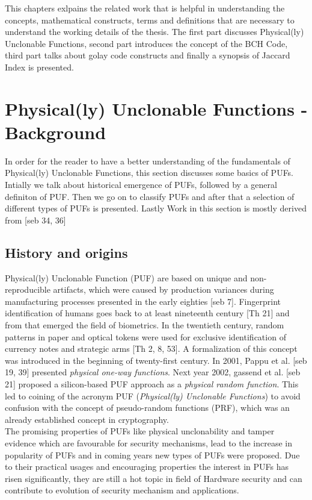 This chapters exlpains the related work that is helpful in understanding the concepts, mathematical constructs, terms and definitions that are necessary to understand the working details of the thesis. The first part discusses Physical(ly) Unclonable Functions, second part introduces the concept of the BCH Code, third part talks about golay code constructs and finally a synopsis of Jaccard Index is presented.

\section{Physical(ly) Unclonable Functions - Background}
In order for the reader to have a better understanding of the fundamentals of Physical(ly) Unclonable Functions, this section discusses some basics of PUFs. Intially we talk about historical emergence of PUFs, followed by a general definiton of PUF. Then we go on to classify PUFs and after that a selection of different types of PUFs is presented. Lastly %
Work in this section is mostly derived from [seb 34, 36]\\

\subsection{History and origins}
Physical(ly) Unclonable Function (PUF) are based on unique and non-reproducible artifacts, which were caused by production variances during manufacturing processes presented in the early eighties [seb 7]. Fingerprint identification of humans goes back to at least nineteenth century [Th 21] and from that emerged the field of biometrics. In the twentieth century, random patterns in paper and optical tokens were used for exclusive identification of currency notes and strategic arms [Th 2, 8, 53]. A formalization of this concept was introduced in the beginning of twenty-first century. In 2001, Pappu et al. [seb 19, 39] presented \emph{physical one-way functions}. Next year 2002, gassend et al. [seb 21] proposed a silicon-based PUF approach as a \emph{physical random function}. This led to coining of the acronym PUF (\emph{Physical(ly) Unclonable Functions}) to avoid confusion with the concept of pseudo-random functions (PRF), which was an already established concept in cryptography.\\

The promising properties of PUFs like physical unclonability and tamper evidence which are favourable for security mechanisms, lead to the increase in popularity of PUFs and in coming years new types of PUFs were proposed. Due to their practical usages and encouraging properties the interest in PUFs has risen significantly, they are still a hot topic in field of Hardware security and can contribute to evolution of security mechanism and applications.\\

